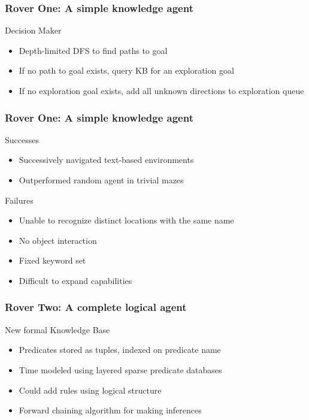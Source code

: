 \begin{frame}
    \frametitle{Rover One: A simple knowledge agent}

    \begin{block}{Decision Maker}
        \begin{itemize}
            \item Depth-limited DFS to find paths to goal
            \item If no path to goal exists, query KB for an exploration
                goal
            \item If no exploration goal exists, add all unknown
                directions to exploration queue
        \end{itemize}
    \end{block}
\end{frame}

\begin{frame}
    \frametitle{Rover One: A simple knowledge agent}

    \begin{block}{Successes}
        \begin{itemize}
            \item Successively navigated text-based environments
            \item Outperformed random agent in trivial mazes
        \end{itemize}
    \end{block}

    \begin{block}{Failures}
        \begin{itemize}
            \item Unable to recognize distinct locations with the same
                name
            \item No object interaction
            \item Fixed keyword set
            \item Difficult to expand capabilities
        \end{itemize}
    \end{block}

\end{frame}

\begin{frame}
    \frametitle{Rover Two: A complete logical agent}

    \begin{block}{New formal Knowledge Base}
        \begin{itemize}
            \item Predicates stored as tuples, indexed on predicate name
            \item Time modeled using layered sparse predicate databases
            \item Could add rules using logical structure
            \item Forward chaining algorithm for making inferences
        \end{itemize}
    \end{block}

\end{frame}

